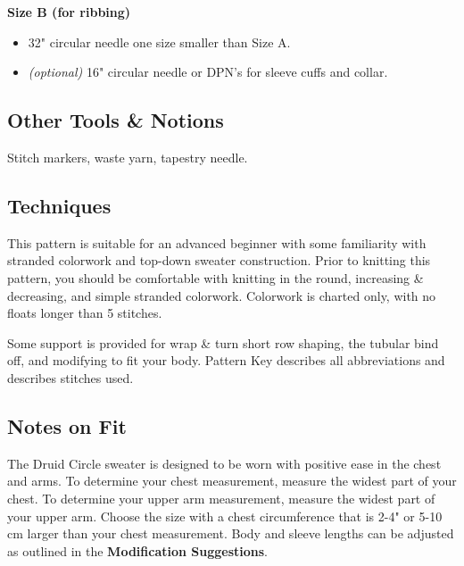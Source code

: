 \documentclass[12pt]{article}
\begin{document}
\begin{multicols}{2}
\textbf{Size B (for ribbing)}
\begin{itemize}
\item 32" circular needle one size smaller than Size A.
\item \emph{(optional)} 16" circular needle or DPN's for sleeve cuffs and collar.
\end{itemize}
\vfill

\newpage
\subsection*{Other Tools \& Notions}

Stitch markers, waste yarn, tapestry needle.

\subsection*{Techniques}

This pattern is suitable for an advanced beginner with some familiarity with stranded colorwork and top-down sweater construction.
Prior to knitting this pattern, you should be comfortable with knitting in the round, increasing \& decreasing, and simple stranded colorwork. Colorwork is charted only, with no floats longer than 5 stitches. 

Some support is provided for wrap \& turn short row shaping, the tubular bind off, and modifying to fit your body.
Pattern Key describes all abbreviations and describes stitches used.



\subsection*{Notes on Fit}

The Druid Circle sweater is designed to be worn with positive ease in the chest and arms. To determine your chest measurement, measure the widest part of your chest. To determine your upper arm measurement, measure the widest part of your upper arm. Choose the size with a chest circumference that is 2-4" or 5-10 cm larger than your chest measurement. Body and sleeve lengths can be adjusted as outlined in the \textbf{Modification Suggestions}.


\end{multicols}
\end{document}
